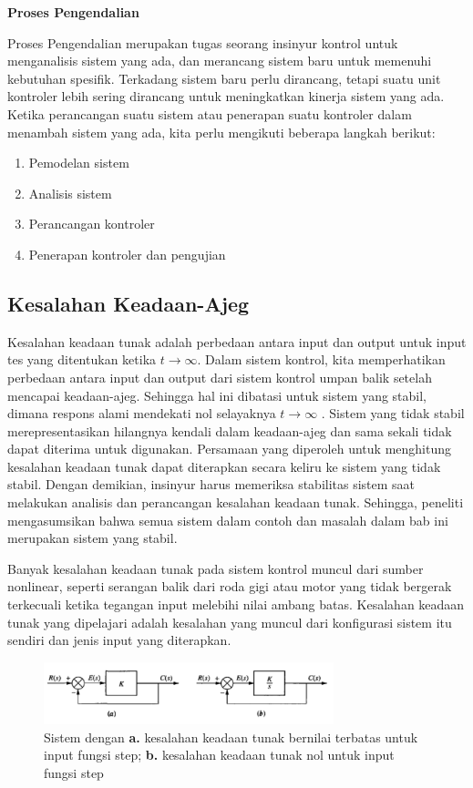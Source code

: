 \noindent	\textbf{Proses Pengendalian}

Proses Pengendalian merupakan tugas seorang insinyur kontrol untuk menganalisis sistem yang ada, dan merancang sistem baru untuk memenuhi kebutuhan spesifik. Terkadang sistem baru perlu dirancang, tetapi suatu unit kontroler lebih sering dirancang untuk meningkatkan kinerja sistem yang ada. Ketika perancangan suatu sistem atau penerapan suatu kontroler dalam menambah sistem yang ada, kita perlu mengikuti beberapa langkah berikut:

\begin{enumerate}
	\item Pemodelan sistem
	\item Analisis sistem
	\item Perancangan kontroler
	\item Penerapan kontroler dan pengujian
\end{enumerate}

\subsection{Kesalahan Keadaan-Ajeg}

Kesalahan keadaan tunak adalah perbedaan antara input dan output untuk input tes yang ditentukan ketika $t \rightarrow \infty$. Dalam sistem kontrol, kita memperhatikan perbedaan antara input dan output dari sistem kontrol umpan balik setelah mencapai keadaan-ajeg. Sehingga hal ini dibatasi untuk sistem yang stabil, dimana respons alami mendekati nol selayaknya $t \rightarrow \infty$ . Sistem yang tidak stabil merepresentasikan hilangnya kendali dalam keadaan-ajeg dan sama sekali tidak dapat diterima untuk digunakan. Persamaan yang diperoleh untuk menghitung kesalahan keadaan tunak dapat diterapkan secara keliru ke sistem yang tidak stabil. Dengan demikian, insinyur harus memeriksa stabilitas sistem saat melakukan analisis dan perancangan kesalahan keadaan tunak. Sehingga, peneliti mengasumsikan bahwa semua sistem dalam contoh dan masalah dalam bab ini merupakan sistem yang stabil.

Banyak kesalahan keadaan tunak pada sistem kontrol muncul dari sumber nonlinear, seperti serangan balik dari roda gigi atau motor yang tidak bergerak terkecuali ketika tegangan input melebihi nilai ambang batas. Kesalahan keadaan tunak yang dipelajari adalah kesalahan yang muncul dari konfigurasi sistem itu sendiri dan jenis input yang diterapkan. 

\begin{figure}[!h]
	\centering
	\includegraphics[width=0.75\textwidth]{figures/SSEExample}
	\caption{Sistem dengan \textbf{a.} kesalahan keadaan tunak bernilai terbatas untuk input fungsi step; \textbf{b.} kesalahan keadaan tunak nol untuk input fungsi step}
	\label{fig:3:steadystateerror}
\end{figure}

